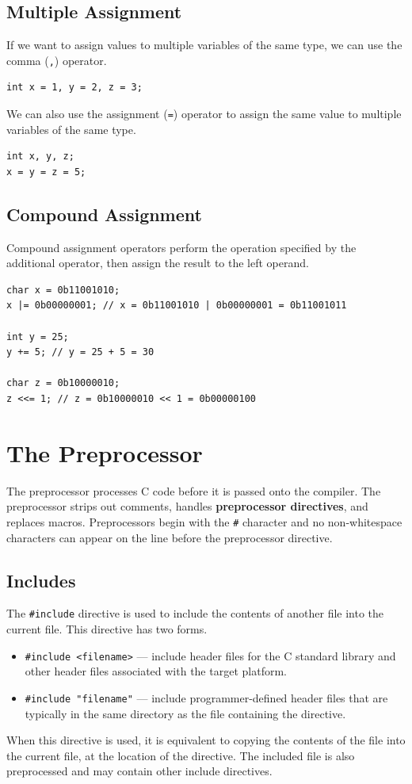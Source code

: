 \documentclass[a4paper]{report}
\begin{document}
\section{Multiple Assignment}
If we want to assign values to multiple variables of the same type, we can use the comma (\texttt{,}) operator.
\begin{verbatim}
int x = 1, y = 2, z = 3;
\end{verbatim}
We can also use the assignment (\texttt{=}) operator to assign the same value to multiple variables of the same type.
\begin{verbatim}
int x, y, z;
x = y = z = 5;
\end{verbatim}
\section{Compound Assignment}
Compound assignment operators perform the operation specified by the additional operator,
then assign the result to the left operand.
\begin{verbatim}
char x = 0b11001010;
x |= 0b00000001; // x = 0b11001010 | 0b00000001 = 0b11001011

int y = 25;
y += 5; // y = 25 + 5 = 30

char z = 0b10000010;
z <<= 1; // z = 0b10000010 << 1 = 0b00000100
\end{verbatim}
\chapter{The Preprocessor}
The preprocessor processes C code before it is passed onto the compiler.
The preprocessor strips out comments, handles \textbf{preprocessor directives}, and replaces macros.
Preprocessors begin with the \texttt{#} character and no non-whitespace characters can
appear on the line before the preprocessor directive.
\section{Includes}
The \texttt{#include} directive is used to include the contents of another file into the current file.
This directive has two forms.
\begin{itemize}
    \item \texttt{#include <filename>} --- include header files for the C standard library and other header files associated with the target platform.
    \item \texttt{#include "filename"} --- include programmer-defined header files that are typically in the same directory as the file containing the directive. %
\end{itemize}
When this directive is used, it is equivalent to copying the contents of the file into the current file,
at the location of the directive. The included file is also preprocessed and may contain other include directives.
\end{document}
